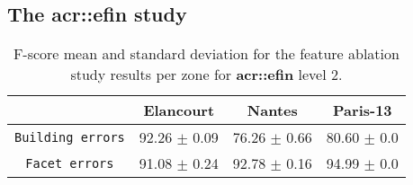         \FloatBarrier
    \subsection{The \texorpdfstring{\acrlong*{acr::efin}}{eFin} study}
        \begin{table}[htbp]
            \centering
            \footnotesize
            \begin{tabular}{c c c c}
                \toprule
                & \textbf{Elancourt} & \textbf{Nantes} & \textbf{Paris-13}\\
                \midrule
                \texttt{Building errors} & 92.26 $\pm$ 0.09 & 76.26 $\pm$ 0.66 & 80.60 $\pm$ 0.0 \\
                \midrule
                \texttt{Facet errors} & 91.08 $\pm$ 0.24 & 92.78 $\pm$ 0.16 & 94.99 $\pm$ 0.0 \\
                \bottomrule
            \end{tabular}
            \caption{
                \label{tab::f_score_ablation_f2}
                F-score mean and standard deviation for the feature ablation study results per zone for \textbf{\gls{acr::efin}} level 2.
            }
        \end{table}

